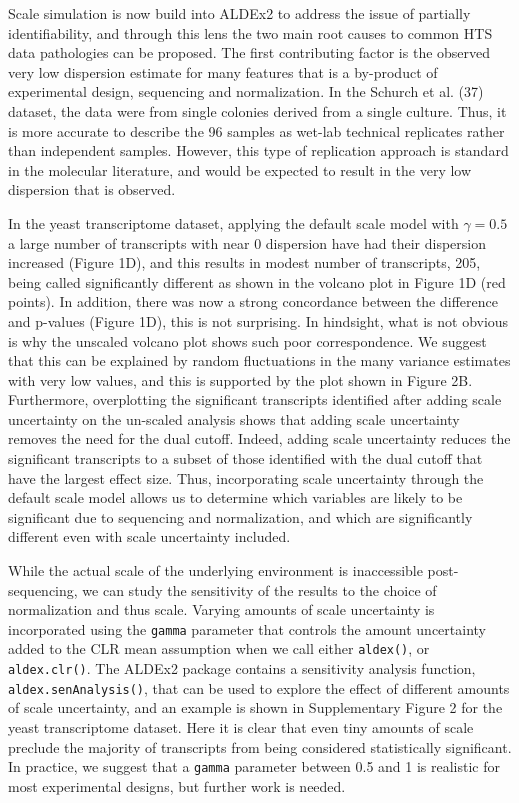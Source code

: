 \documentclass[
]{article}
\begin{document}
Scale simulation is now build into ALDEx2 to address the issue of
partially identifiability, and through this lens the two main root
causes to common HTS data pathologies can be proposed. The first
contributing factor is the observed very low dispersion estimate for
many features that is a by-product of experimental design, sequencing
and normalization. In the Schurch et al. (37) dataset, the data were
from single colonies derived from a single culture. Thus, it is more
accurate to describe the 96 samples as wet-lab technical replicates
rather than independent samples. However, this type of replication
approach is standard in the molecular literature, and would be expected
to result in the very low dispersion that is observed.

In the yeast transcriptome dataset, applying the default scale model
with \(\gamma=0.5\) a large number of transcripts with near 0 dispersion
have had their dispersion increased (Figure 1D), and this results in
modest number of transcripts, 205, being called significantly different
as shown in the volcano plot in Figure 1D (red points). In addition,
there was now a strong concordance between the difference and p-values
(Figure 1D), this is not surprising. In hindsight, what is not obvious
is why the unscaled volcano plot shows such poor correspondence. We
suggest that this can be explained by random fluctuations in the many
variance estimates with very low values, and this is supported by the
plot shown in Figure 2B. Furthermore, overplotting the significant
transcripts identified after adding scale uncertainty on the un-scaled
analysis shows that adding scale uncertainty removes the need for the
dual cutoff. Indeed, adding scale uncertainty reduces the significant
transcripts to a subset of those identified with the dual cutoff that
have the largest effect size. Thus, incorporating scale uncertainty
through the default scale model allows us to determine which variables
are likely to be significant due to sequencing and normalization, and
which are significantly different even with scale uncertainty included.

While the actual scale of the underlying environment is inaccessible
post-sequencing, we can study the sensitivity of the results to the
choice of normalization and thus scale. Varying amounts of scale
uncertainty is incorporated using the \texttt{gamma} parameter that
controls the amount uncertainty added to the CLR mean assumption when we
call either \texttt{aldex()}, or \texttt{aldex.clr()}. The ALDEx2
package contains a sensitivity analysis function,
\texttt{aldex.senAnalysis()}, that can be used to explore the effect of
different amounts of scale uncertainty, and an example is shown in
Supplementary Figure 2 for the yeast transcriptome dataset. Here it is
clear that even tiny amounts of scale preclude the majority of
transcripts from being considered statistically significant. In
practice, we suggest that a \texttt{gamma} parameter between 0.5 and 1
is realistic for most experimental designs, but further work is needed.
\end{document}
